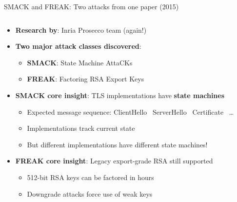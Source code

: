 \documentclass[aspectratio=169, lualatex, handout]{beamer}
\begin{document}
\begin{frame}{SMACK and FREAK: Two attacks from one paper (2015)}
	\begin{columns}[c]
		\begin{column}{1\textwidth}
			\begin{itemize}
				\item \textbf{Research by}: Inria Prosecco team (again!)
				\item \textbf{Two major attack classes discovered}:
				      \begin{itemize}
					      \item \textbf{SMACK}: State Machine AttaCKs
					      \item \textbf{FREAK}: Factoring RSA Export Keys
				      \end{itemize}
				\item \textbf{SMACK core insight}: TLS implementations have \textbf{state machines}
				      \begin{itemize}
					      \item Expected message sequence: ClientHello \rightarrow\ ServerHello \rightarrow\ Certificate \rightarrow\ \ldots
					      \item Implementations track current state
					      \item But different implementations have different state machines!
				      \end{itemize}
				\item \textbf{FREAK core insight}: Legacy export-grade RSA still supported
				      \begin{itemize}
					      \item 512-bit RSA keys can be factored in hours
					      \item Downgrade attacks force use of weak keys
				      \end{itemize}
			\end{itemize}
		\end{column}
	\end{columns}
\end{frame}
\end{document}
